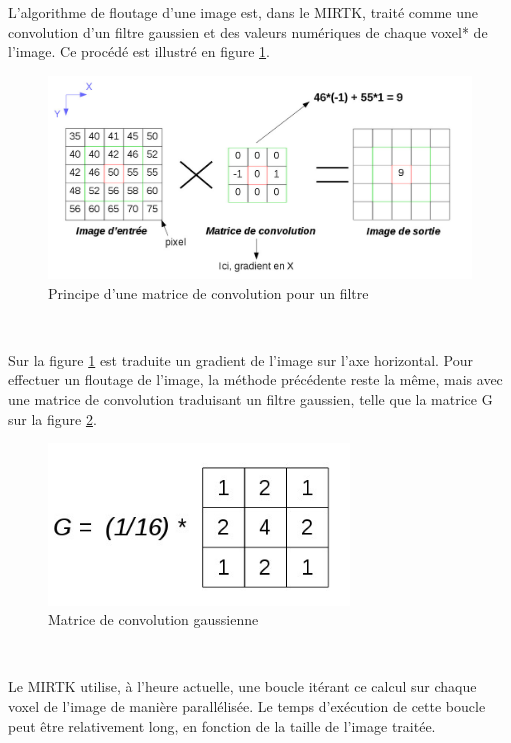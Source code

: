 \documentclass[10pt]{report}
\begin{document}
	L'algorithme de floutage d'une image est, dans le MIRTK, traité comme une convolution d'un filtre gaussien et des valeurs numériques de chaque voxel* de l'image. Ce procédé est illustré en figure \ref{Principe d'une matrice de convolution pour un filtre}.
	\begin{figure}[h!]
		\begin{center}
			\includegraphics[width=14cm]{convolve.jpg}
		\end{center}
		\caption{Principe d'une matrice de convolution pour un filtre}
		\label{Principe d'une matrice de convolution pour un filtre}
	\end{figure} ~\par
	Sur la figure \ref{Principe d'une matrice de convolution pour un filtre} est traduite un gradient de l'image sur l'axe horizontal. Pour effectuer un floutage de l'image, la méthode précédente reste la même, mais avec une matrice de convolution traduisant un filtre gaussien, telle que la matrice G sur la figure \ref {Matrice de convolution gaussienne}.
	\begin{figure}[h!]
		\begin{center}
			\includegraphics[width=8cm]{matrix_gaussian.jpg}
		\end{center}
		\caption{Matrice de convolution gaussienne}
		\label{Matrice de convolution gaussienne}
	\end{figure} ~\par
	Le MIRTK utilise, à l'heure actuelle, une boucle itérant ce calcul sur chaque voxel de l'image de manière parallélisée. Le temps d'exécution de cette boucle  peut être relativement long, en fonction de la taille de l'image traitée. 
\end{document}
